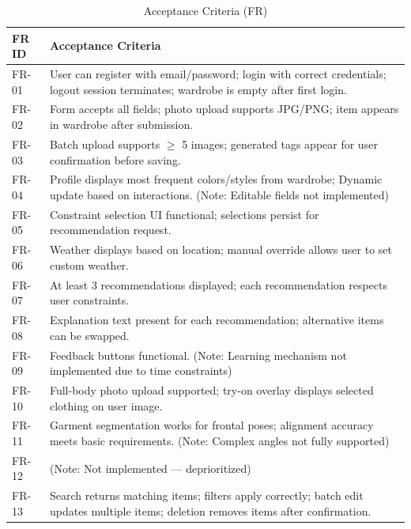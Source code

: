 \begin{table}[ht]
\centering
\caption{Acceptance Criteria (FR)}
\label{tab:full_fr_criteria}
\renewcommand{\arraystretch}{1}
\begin{tabular}{p{1.6cm}p{13.2cm}}
    \toprule
    \textbf{FR ID} & \textbf{Acceptance Criteria} \\
    \midrule
    FR-01 &
    User can register with email/password; login with correct credentials; logout session terminates; wardrobe is empty after first login.\\
    
    FR-02 &
    Form accepts all fields; photo upload supports JPG/PNG; item appears in wardrobe after submission.\\
    
    FR-03 &
    Batch upload supports $\geq$ 5 images; generated tags appear for user confirmation before saving.\\
    
    FR-04 &
    Profile displays most frequent colors/styles from wardrobe; Dynamic update based on interactions. (Note: Editable fields not implemented) \\
    
    FR-05 &
    Constraint selection UI functional; selections persist for recommendation request. \\
    
    FR-06 &
    Weather displays based on location; manual override allows user to set custom weather. \\
    
    FR-07 &
    At least 3 recommendations displayed; each recommendation respects user constraints.\\
    
    FR-08 &
    Explanation text present for each recommendation; alternative items can be swapped. \\
    
    FR-09 &
    Feedback buttons functional. (Note: Learning mechanism not implemented due to time constraints) \\
    
    FR-10 &
   Full-body photo upload supported; try-on overlay displays selected clothing on user image. \\
    
    FR-11 &
    Garment segmentation works for frontal poses; alignment accuracy meets basic requirements. (Note: Complex angles not fully supported) \\
    
    FR-12 &
    (Note: Not implemented — deprioritized) \\
    
    FR-13 &
    Search returns matching items; filters apply correctly; batch edit updates multiple items; deletion removes items after confirmation.\\
    \bottomrule
\end{tabular}
\end{table}

